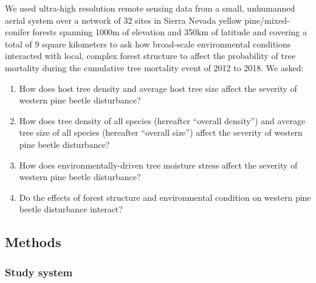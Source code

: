 \documentclass[]{article}
\begin{document}
We used ultra-high resolution remote sensing data from a small,
unhumanned aerial system over a network of 32 sites in Sierra Nevada
yellow pine/mixed-conifer forests spanning 1000m of elevation and 350km
of latitude and covering a total of 9 square kilometers to ask how
broad-scale environmental conditions interacted with local, complex
forest structure to affect the probability of tree mortality during the
cumulative tree mortality event of 2012 to 2018. We asked:

\begin{enumerate}
\def\labelenumi{\arabic{enumi}.}
\item
  How does host tree density and average host tree size affect the
  severity of western pine beetle disturbance?
\item
  How does tree density of all species (hereafter ``overall density'')
  and average tree size of all species (hereafter ``overall size'')
  affect the severity of western pine beetle disturbance?
\item
  How does environmentally-driven tree moisture stress affect the
  severity of western pine beetle disturbance?
\item
  Do the effects of forest structure and environmental condition on
  western pine beetle disturbance interact?
\end{enumerate}

\subsection{Methods}\label{methods}

\subsubsection{Study system}\label{study-system}
\end{document}

